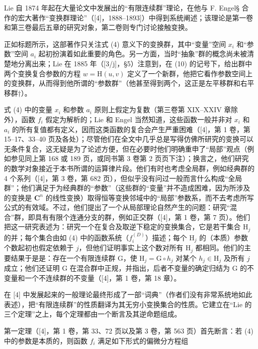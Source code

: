 
Lie 自 1874 年起在大量论文中发展出的“有限连续群”理论，在他与 F. Engel§ 合作的宏大著作“变换群理论”（{[}4{]}，1888--1893{]}）中得到系统阐述；该理论是第一卷和第三卷最后五章的研究对象，第二卷则专门讨论接触变换。

正如标题所示，这部著作只关注式 (4) 意义下的变换群，其中“变量”空间 \(x_{i}\) 和“参数”空间 \(a_{i}\) 起初扮演着如此重要的角色。另一方面，当时“抽象”群的概念尚未被清楚地分离出来；Lie 在 1885 年（{[}3/j{]}，§5）注意到，在 (10) 的记号下，给出群中两个变换复合参数的方程 \(w = \mathrm{H}(u, v)\) 定义了一个新群，他把它看作参数空间上的变换群，从而得到他所谓的“参数群”（他甚至得到两个，这正是左平移群和右平移群†）。

式 (4) 中的变量 \(x_{i}\) 和参数 \(a_{i}\) 原则上假定为复数（第三卷第 XIX--XXIV 章除外），函数 \(f_{i}\) 假定为解析的；Lie 和 Engel 当然知道，这些函数一般并非对 \(x_{i}\) 和 \(a_{i}\) 的所有复值都有定义，因而这类函数的复合会产生严重困难（{[}4{]}，第 1 卷，第 15--17、33--40 页及各处）；尽管他们在全文中几乎总是写得仿佛所研究的变换可以无条件复合，这无疑是为了论述方便，但在必要时他们明确重申了“局部”观点（例如参见同上第 168 或 189 页，或同书第 3 卷第 2 页页下注）；换言之，他们研究的数学对象接近于本书所谓的运算律片段。他们有时也考虑全局群，例如经典群的 4 个系列（{[}4{]}，第 3 卷，第 682 页），但似乎没有问过一般而言什么构成“全局群”；他们满足于为经典群的“参数”（这些群的“变量”并不造成困难，因为所涉及的变换是 \(\mathbf{C}^n\) 的线性变换）取得恒等变换邻域中的“局部”参数系，而不去考虑所写公式的有效域。不过，他们提出了一个从局部理论自然产生的问题：研究“混合”群，即具有有限个连通分支的群，例如正交群（{[}4{]}，第 1 卷，第 7 页）。他们把这一研究表述为：研究一个在复合及取逆下稳定的变换集合，它是若干集合 \(\mathrm{H}_j\) 的并；每个集合由如 (4) 中的函数系统（\(f_i^{(D)}\)）描述；每个 \(\mathrm{H}_j\) 的（本质）参数个数起初也假定依赖于 \(j\)，但他们证明事实上这个数对所有 \(\mathrm{H}_j\) 都相同。他们的主要结果于是是：存在一个有限连续群 G，使 \(\mathrm{H}_j = \mathrm{G} \circ h_j\) 对某个 \(h_j \in \mathrm{H}_j\) 及所有 \(j\) 成立；他们还证明 G 在混合群中正规，并指出，后者不变量的确定归结为 G 的不变量和一个不连续群的不变量（{[}4{]}，第 1 卷，第 18 章）。

在 {[}4{]} 中发展起来的一般理论最终形成了一部“词典”（作者们没有非常系统地如此表述），把“有限连续群”的性质翻译为其无穷小变换集合的性质。它建立在“Lie 的三个定理”之上，每个定理都由一个断言及其逆命题组成。

第一定理（{[}4{]}，第 1 卷，第 33、72 页以及第 3 卷，第 563 页）首先断言：若 (4) 中的参数是本质的，则函数 \(f_{i}\) 满足如下形式的偏微分方程组

